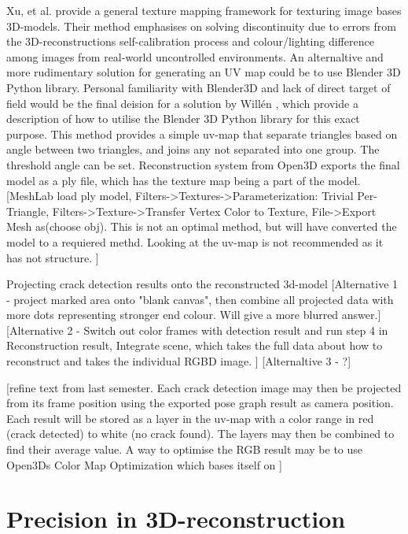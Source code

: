 Xu, et al. \cite{Xu2010} provide a general texture mapping framework for texturing image bases 3D-models. Their method emphasises on solving discontinuity due to errors from the 3D-reconstructions self-calibration process and colour/lighting difference among images from real-world uncontrolled environments. An alternaltive and more rudimentary solution for generating an UV map could be to use Blender 3D Python library.  Personal familiarity with Blender3D and lack of direct target of field would be the final deision for a solution by Willén \cite{Willen2016}, which provide a description of how to utilise the Blender 3D Python library for this exact purpose. This method provides a simple uv-map that separate triangles based on angle between two triangles, and joins any not separated into one group. The threshold angle can be set. Reconstruction system from Open3D exports the final model as a ply file, which has the texture map being a part of the model. 
[MeshLab load ply model, Filters->Textures->Parameterization: Trivial Per-Triangle, Filters->Texture->Transfer Vertex Color to Texture, File->Export Mesh as(choose obj). This is not an optimal method, but will have converted the model to a requiered methd. Looking at the uv-map is not recommended as it has not structure. ]

Projecting crack detection results onto the reconstructed 3d-model 
[Alternative 1 - project marked area onto "blank canvas", then combine all projected data with more dots representing stronger end colour. Will give a more blurred answer.]
[Alternative 2 - Switch out color frames with detection result and run step 4 in Reconstruction result,  Integrate scene, which takes the full data about how to reconstruct and takes the individual RGBD image. ]
[Alternaltive 3 - ?]



[refine text from last semester. Each crack detection image may then be projected from its frame position using the exported pose graph result as camera position. Each result will be stored as a layer in the uv-map with a color range in red (crack detected) to white (no crack found). The layers may then be combined to find their average value. A way to optimise the RGB result may be to use Open3Ds Color Map Optimization which bases itself on \cite{zhou2016}]




\section{Precision in 3D-reconstruction}

